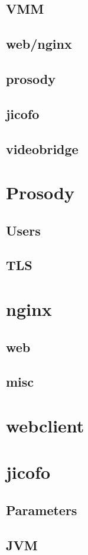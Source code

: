 \documentclass[conference]{IEEEtran}
\begin{document}
\subsection{VMM}
\subsection{web/nginx}
\subsection{prosody}
\subsection{jicofo}
\subsection{videobridge}
\section{Prosody}
\subsection{Users}
\subsection{TLS}
\section{nginx}
\subsection{web}
\subsection{misc}
\section{webclient}
\section{jicofo}
\subsection{Parameters}
\subsection{JVM}
\end{document}
